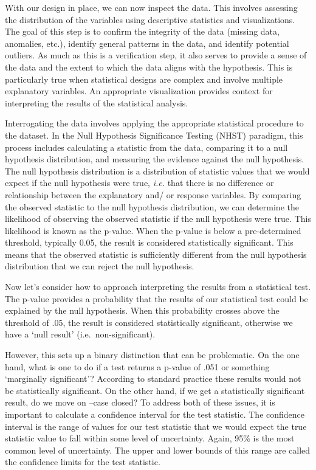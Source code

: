 \documentclass[
  letterpaper,
  DIV=11,
  numbers=noendperiod]{scrreprt}
\theoremstyle{definition}
\theoremstyle{remark}
\begin{document}
With our design in place, we can now inspect the data. This involves
assessing the distribution of the variables using descriptive statistics
and visualizations. The goal of this step is to confirm the integrity of
the data (missing data, anomalies, etc.), identify general patterns in
the data, and identify potential outliers. As much as this is a
verification step, it also serves to provide a sense of the data and the
extent to which the data aligns with the hypothesis. This is
particularly true when statistical designs are complex and involve
multiple explanatory variables. An appropriate visualization provides
context for interpreting the results of the statistical analysis.

Interrogating the data involves applying the appropriate statistical
procedure to the dataset. In the Null Hypothesis Significance Testing
(NHST) paradigm, this process includes calculating a statistic from the
data, comparing it to a null hypothesis distribution, and measuring the
evidence against the null hypothesis. The null hypothesis distribution
is a distribution of statistic values that we would expect if the null
hypothesis were true, \emph{i.e.} that there is no difference or
relationship between the explanatory and/ or response variables. By
comparing the observed statistic to the null hypothesis distribution, we
can determine the likelihood of observing the observed statistic if the
null hypothesis were true. This likelihood is known as the p-value. When
the p-value is below a pre-determined threshold, typically 0.05, the
result is considered statistically significant. This means that the
observed statistic is sufficiently different from the null hypothesis
distribution that we can reject the null hypothesis.

Now let's consider how to approach interpreting the results from a
statistical test. The p-value provides a probability that the results of
our statistical test could be explained by the null hypothesis. When
this probability crosses above the threshold of .05, the result is
considered statistically significant, otherwise we have a `null result'
(i.e.~non-significant).

However, this sets up a binary distinction that can be problematic. On
the one hand, what is one to do if a test returns a p-value of .051 or
something `marginally significant'? According to standard practice these
results would not be statistically significant. On the other hand, if we
get a statistically significant result, do we move on --case closed? To
address both of these issues, it is important to calculate a confidence
interval for the test statistic. The confidence interval is the range of
values for our test statistic that we would expect the true statistic
value to fall within some level of uncertainty. Again, 95\% is the most
common level of uncertainty. The upper and lower bounds of this range
are called the confidence limits for the test statistic.
\end{document}
